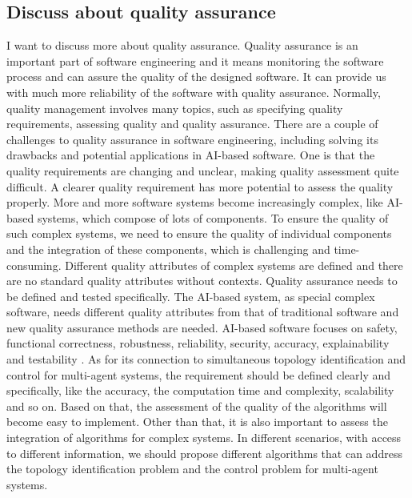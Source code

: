\documentclass[11pt]{article}
\begin{document}
\subsection*{Discuss about quality assurance}
I want to discuss more about quality assurance. Quality assurance is an important part of software engineering and it means monitoring the software process and can assure the quality of the designed software. It can provide us with much more reliability of the software with quality assurance. Normally, quality management involves many topics, such as specifying quality requirements, assessing quality and quality assurance.  There are a couple of challenges to quality assurance in software engineering, including solving its drawbacks and potential applications in AI-based software\cite{gezici2022systematic}. One is that the quality requirements are changing and unclear, making quality assessment quite difficult. A clearer quality requirement has more potential to assess the quality properly. More and more software systems become increasingly complex, like AI-based systems, which compose of lots of components. To ensure the quality of such complex systems, we need to ensure the quality of individual components and the integration of these components, which is challenging and time-consuming. Different quality attributes of complex systems are defined and there are no standard quality attributes without contexts. Quality assurance needs to be defined and tested specifically. The AI-based system, as special complex software, needs different quality attributes from that of traditional software and new quality assurance methods are needed\cite{gezici2022systematic}. AI-based software focuses on safety, functional correctness, robustness, reliability, security, accuracy, explainability and testability \cite{martinez2022software}. As for its connection to simultaneous topology identification and control for multi-agent systems, the requirement should be defined clearly and specifically, like the accuracy, the computation time and complexity, scalability and so on. Based on that, the assessment of the quality of the algorithms will become easy to implement. Other than that, it is also important to assess the integration of algorithms for complex systems. In different scenarios, with access to different information, we should propose different algorithms that can address the topology identification problem and the control problem for multi-agent systems. 
\\
\end{document}
